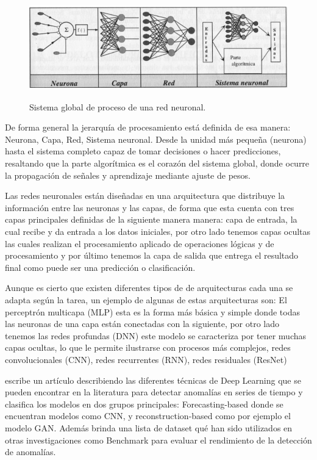 \documentclass[11pt,a4paper,spanish]{book}
\numberwithin{equation}{chapter}
\numberwithin{figure}{chapter}
\begin{document}
\begin{figure}[h]
    \caption{Sistema global de proceso de una red neuronal. \protect\cite{larranaga2021redes}}
    \centering
    \includegraphics[width=1.0\textwidth]{media/sistema-neuronal.png}
    \label{fig:figSistemaNeuronal}
\end{figure}



De forma general la jerarquía de procesamiento está definida de esa manera: Neurona, Capa, 
Red, Sistema neuronal. Desde la unidad más pequeña (neurona) hasta el sistema completo 
capaz de tomar decisiones o hacer predicciones, resaltando que la parte algorítmica es 
el corazón del sistema global, donde ocurre la propagación de señales y aprendizaje 
mediante ajuste de pesos. \cite{larranaga2021redes}


Las redes neuronales están diseñadas en una arquitectura que distribuye la información 
entre las neuronas y las capas, de forma que esta cuenta con tres capas principales 
definidas de la siguiente manera manera: capa de entrada, la cual recibe y da entrada a 
los datos iniciales, por otro lado tenemos capas ocultas las cuales realizan el 
procesamiento aplicado de operaciones lógicas y de procesamiento y por último tenemos 
la capa de salida que entrega el resultado final como puede ser una predicción o 
clasificación. \cite{larranaga2021redes} 


Aunque es cierto que existen diferentes tipos de de arquitecturas cada una se adapta 
según la tarea, un ejemplo de algunas de estas arquitecturas son: 
El perceptrón multicapa (MLP) esta es la forma más básica y simple donde todas las 
neuronas de una capa están conectadas con la siguiente, por otro lado tenemos las redes 
profundas (DNN) este modelo se caracteriza por tener muchas capas ocultas, lo que le 
permite ilustrarse con procesos más complejos, redes convolucionales (CNN), redes 
recurrentes (RNN), redes residuales (ResNet)


\cite{Zamanzadeh_Darban_2024} escribe un artículo describiendo las diferentes técnicas 
de Deep Learning que se pueden encontrar en la literatura para detectar anomalías en 
series de tiempo y clasifica los modelos en dos grupos principales: 
Forecasting-based donde se encuentran modelos como CNN, y reconstruction-based 
como por ejemplo el modelo GAN. Además brinda una lista de dataset qué han sido 
utilizados en otras investigaciones como Benchmark para evaluar el rendimiento de la 
detección de anomalías.
\end{document}
